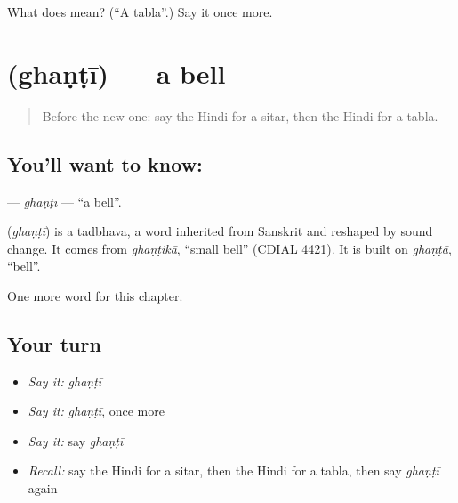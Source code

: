 \begin{tcolorbox}[breakable,colback=teal!4,colframe=teal!35!black,title={Before you move on}]
What does  mean? (\textquotedblleft{}A tabla\textquotedblright{}.) Say it once more.
\end{tcolorbox}
\section[\texorpdfstring{\hi{घंटी} (ghaṇṭī)}{घंटी (ghaṇṭī)}]{ (ghaṇṭī) — a bell}

\label{lesson:HI-C264-ghanti}



\begin{quote}
Before the new one: say the Hindi for a sitar, then the Hindi for a tabla.
\end{quote}

\subsection*{You'll want to know: }
\textbf{} — \emph{ghaṇṭī} — \textquotedblleft{}a bell\textquotedblright{}.

\begin{cousinweb}
\textbf{} (\emph{ghaṇṭī}) is a tadbhava, a word inherited from Sanskrit and reshaped by sound change. It comes from \emph{ghaṇṭikā}, \textquotedblleft{}small bell\textquotedblright{} (CDIAL 4421). It is built on \emph{ghaṇṭā}, \textquotedblleft{}bell\textquotedblright{}.
\end{cousinweb}

\begin{grammarlens}[title={What you've built}]
One more word for this chapter.
\end{grammarlens}

\subsection*{Your turn}
\begin{itemize}
\raggedright
  \item \emph{Say it:} \emph{ghaṇṭī}
  \item \emph{Say it:} \emph{ghaṇṭī}, once more
  \item \emph{Say it:} say \emph{ghaṇṭī}
  \item \emph{Recall:} say the Hindi for a sitar, then the Hindi for a tabla, then say \emph{ghaṇṭī} again
\end{itemize}

